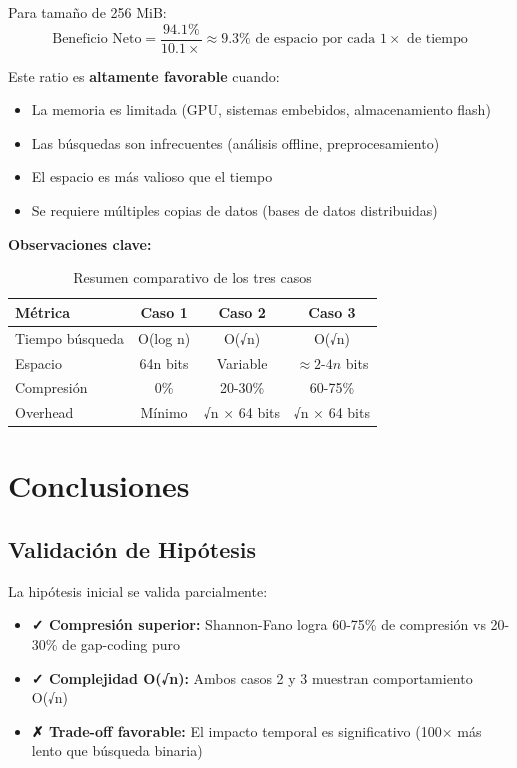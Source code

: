 \documentclass[11pt, twocolumn]{article}
\begin{document}
Para tamaño de 256 MiB:
\begin{equation}
\text{Beneficio Neto} = \frac{94.1\%}{10.1×} \approx 9.3\% \text{ de espacio por cada } 1× \text{ de tiempo}
\end{equation}

Este ratio es \textbf{altamente favorable} cuando:
\begin{itemize}
    \item La memoria es limitada (GPU, sistemas embebidos, almacenamiento flash)
    \item Las búsquedas son infrecuentes (análisis offline, preprocesamiento)
    \item El espacio es más valioso que el tiempo
    \item Se requiere múltiples copias de datos (bases de datos distribuidas)
\end{itemize}

\textbf{Observaciones clave:}

\begin{table}[H]
\centering
\begin{tabular}{|l|c|c|c|}
\hline
\textbf{Métrica} & \textbf{Caso 1} & \textbf{Caso 2} & \textbf{Caso 3} \\
\hline
Tiempo búsqueda & O(log n) & O(√n) & O(√n) \\
Espacio & 64n bits & Variable & $\approx 2$-$4n$ bits \\
Compresión & 0\% & 20-30\% & 60-75\% \\
Overhead & Mínimo & √n × 64 bits & √n × 64 bits \\
\hline
\end{tabular}
\caption{Resumen comparativo de los tres casos}
\label{tab:resumen}
\end{table}

\section{Conclusiones}

\subsection{Validación de Hipótesis}

La hipótesis inicial se valida parcialmente:

\begin{itemize}
    \item \textbf{✓ Compresión superior:} Shannon-Fano logra 60-75\% de compresión vs 20-30\% de gap-coding puro
    \item \textbf{✓ Complejidad O(√n):} Ambos casos 2 y 3 muestran comportamiento O(√n)
    \item \textbf{✗ Trade-off favorable:} El impacto temporal es significativo (100$\times$ más lento que búsqueda binaria)
\end{itemize}
\end{document}
